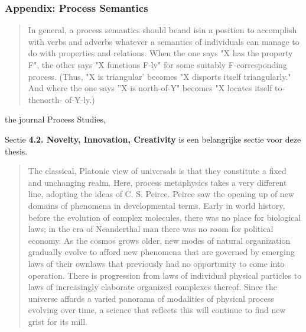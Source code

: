 \documentclass[a4paper]{Thesis}
\begin{document}
	
	\subsubsection{Appendix: Process Semantics}
	\begin{quotation}
		In general, a process semantics should beand isin a position to accomplish with verbs and
		adverbs whatever a semantics of individuals can manage to do with properties and
		relations. When the one says "X has the property F", the other says "X functions F-ly" for
		some suitably F-corresponding process. (Thus, "X is triangular' becomes "X disports itself
		triangularly." And where the one says ''X is north-of-Y" becomes "X locates itself to-thenorth-
		of-Y-ly.)
		
		
	\end{quotation}
	
	the journal Process Studies,
	
	Sectie \textbf{4.2. Novelty, Innovation, Creativity} is een belangrijke sectie voor deze thesis.
	
	
	\begin{quotation}
		The classical, Platonic view of universals is that they constitute a fixed and unchanging
		realm. Here, process metaphysics takes a very different line, adopting the ideas of C. S.
		Peirce. Peirce saw the opening up of new domains of phenomena in developmental
		terms. Early in world history, before the evolution of complex molecules, there was no
		place for biological laws; in the era of Neanderthal man there was no room for political
		economy. As the cosmos grows older, new modes of natural organization gradually
		evolve to afford new phenomena that are governed by emerging laws of their ownlaws
		that previously had no opportunity to come into operation. There is progression from laws
		of individual physical particles to laws of increasingly elaborate organized complexes
		thereof. Since the universe affords a varied panorama of modalities of physical process
		evolving over time, a science that reflects this will continue to find new grist for its mill.
	\end{quotation}
	
	\begin{quotation}
		
	\end{quotation}
	
\end{document}
